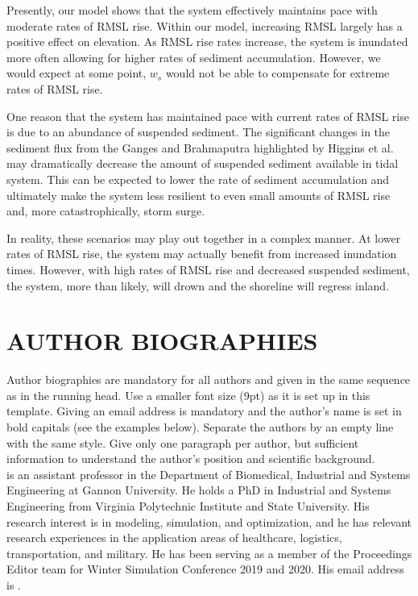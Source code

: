 \documentclass{wscpaperproc}
\theoremstyle{wsc}
\begin{document}
Presently, our model shows that the system effectively maintains pace with moderate rates of RMSL rise. Within our model, increasing RMSL largely has a positive effect on elevation. As RMSL rise rates increase, the system is inundated more often allowing for higher rates of sediment accumulation. However, we would expect at some point, $w_s$ would not be able to compensate for extreme rates of RMSL rise.

One reason that the system has maintained pace with current rates of RMSL rise is due to an abundance of suspended sediment. The significant changes in the sediment flux from the Ganges and Brahmaputra highlighted by Higgins et al. \cite{higginsRiverLinkingIndia2018} may dramatically decrease the amount of suspended sediment available in tidal system. This can be expected to lower the rate of sediment accumulation and ultimately make the system less resilient to even small amounts of RMSL rise and, more catastrophically, storm surge.

In reality, these scenarios may play out together in a complex manner. At lower rates of RMSL rise, the system may actually benefit from increased inundation times. However, with high rates of RMSL rise and decreased suspended sediment, the system, more than likely, will drown and the shoreline will regress inland.


\footnotesize





\section*{AUTHOR BIOGRAPHIES}

{\normalsize Author biographies are mandatory for all authors and given in the same sequence as in the running head. Use a smaller font size (9pt) as it is set up in this template. Giving an email address is mandatory and the author’s name is set in bold capitals (see the examples below). Separate the authors by an empty line with the same style. Give only one paragraph per author, but sufficient information to understand the author’s position and scientific background.} \\

 is an assistant professor in the Department of Biomedical, Industrial and Systems Engineering at Gannon University. He holds a PhD in Industrial and Systems Engineering from Virginia Polytechnic Institute and State University. His research interest is in modeling, simulation, and optimization, and he has relevant research experiences in the application areas of healthcare, logistics, transportation, and military. He has been serving as a member of the Proceedings Editor team for Winter Simulation Conference 2019 and 2020. His email address is . \\
\end{document}
